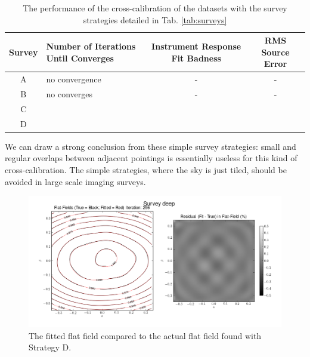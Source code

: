 \documentclass[manuscript]{aastex}
\begin{document}
\begin{table}
\begin{tabular}{|c|p{4cm}|c|c|}
\hline Survey & Number of Iterations Until Converges & Instrument Response Fit Badness & RMS Source Error \\ 
\hline A & no convergence & - & - \\ 
\hline B & no converges & - & - \\ 
\hline C &  &  &  \\ 
\hline D &  &  &  \\ 
\hline 
\end{tabular}
\caption{The performance of the cross-calibration of the datasets with the survey strategies detailed in Tab. \ref{tab:surveys}\label{fig:simple_results}}
\end{table} 

We can draw a strong conclusion from these simple survey strategies: small and regular overlaps between adjacent pointings is essentially useless for this kind of cross-calibration. The simple strategies, where the sky is just tiled, should be avoided in large scale imaging surveys.



\begin{figure}[ht]
\begin{center}
\includegraphics[width=\textwidth]{fit_example.png}
\end{center}
\caption{The fitted flat field compared to the actual flat field found with Strategy D. \label{fig:D}}
\end{figure}
\end{document}
